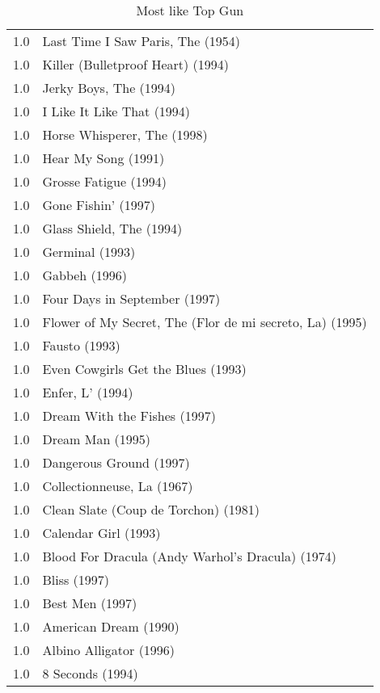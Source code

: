 \begin{table}[h!]
\begin{tabular}{| l | l |}
1.0 & Last Time I Saw Paris, The (1954) \\
1.0 & Killer (Bulletproof Heart) (1994) \\
1.0 & Jerky Boys, The (1994) \\
1.0 & I Like It Like That (1994) \\
1.0 & Horse Whisperer, The (1998) \\
1.0 & Hear My Song (1991) \\
1.0 & Grosse Fatigue (1994) \\
1.0 & Gone Fishin' (1997) \\
1.0 & Glass Shield, The (1994) \\
1.0 & Germinal (1993) \\
1.0 & Gabbeh (1996) \\
1.0 & Four Days in September (1997) \\
1.0 & Flower of My Secret, The (Flor de mi secreto, La) (1995) \\
1.0 & Fausto (1993) \\
1.0 & Even Cowgirls Get the Blues (1993) \\
1.0 & Enfer, L' (1994) \\
1.0 & Dream With the Fishes (1997) \\
1.0 & Dream Man (1995) \\
1.0 & Dangerous Ground (1997) \\
1.0 & Collectionneuse, La (1967) \\
1.0 & Clean Slate (Coup de Torchon) (1981) \\
1.0 & Calendar Girl (1993) \\
1.0 & Blood For Dracula (Andy Warhol's Dracula) (1974) \\
1.0 & Bliss (1997) \\
1.0 & Best Men (1997) \\
1.0 & American Dream (1990) \\
1.0 & Albino Alligator (1996) \\
1.0 & 8 Seconds (1994) \\
\hline
\end{tabular}
\caption{Most like Top Gun}
\label{tab:mltg}
\end{table}

